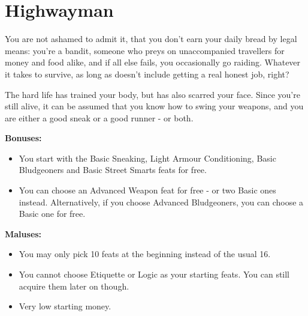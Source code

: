 \section{Highwayman}
You are not ashamed to admit it, that you don't earn your daily bread by legal means: you're a bandit, someone who preys on unaccompanied travellers for money and food alike, and if all else fails, you occasionally go raiding. Whatever it takes to survive, as long as  doesn't include getting a real honest job, right? 

The hard life has trained your body, but has also scarred your face. Since you're still alive, it can be assumed that you know how to swing your weapons, and you are either a good sneak or a good runner - or both. 

\textbf{Bonuses:}
\begin{itemize}
	\item You start with the Basic Sneaking, Light Armour Conditioning, Basic Bludgeoners and Basic Street Smarts feats for free.
	\item You can choose an Advanced Weapon feat for free - or two Basic ones instead. Alternatively, if you choose Advanced Bludgeoners, you can choose a Basic one for free.
\end{itemize}


\textbf{Maluses:}
\begin{itemize}
	\item You may only pick 10 feats at the beginning instead of the usual 16.
	\item You cannot choose Etiquette or Logic as your starting feats. You can still acquire them later on though.
	\item Very low starting money.
\end{itemize}
